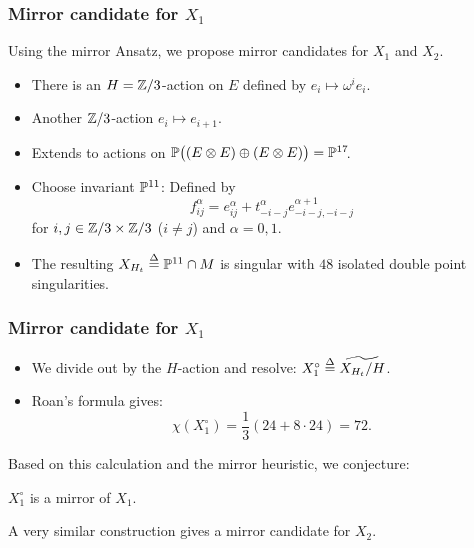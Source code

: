 \begin{frame}
\frametitle{Mirror candidate for $X_1$}

Using the mirror Ansatz, we propose mirror candidates for $X_1$ and $X_2$.

\begin{itemize}[<+->]
	\item
	There is an $H = \Z/3$-action on $E$ defined by $e_i \mapsto \omega^i e_i$.

	\item
	Another $\Z/3$-action $e_i \mapsto e_{i + 1}$.

	\item
	Extends to actions on $\P\big((E \otimes E) \oplus (E \otimes E)\big) = \P^{17}\mkern-4mu$.

	\item
	Choose invariant $\P^{11}$: Defined by
	\[
	    f_{ij}^\alpha = e_{ij}^\alpha + t_{-i-j}^\alpha e_{-i-j,-i-j}^{\alpha+1}
	\]
	for $i,j \in \Z/3 \times \Z/3$ ($i \neq j$) and $\alpha = 0,1$.

	\item
	The resulting $X_{H_t} \defeq \P^{11} \cap M$ is singular with $48$ isolated double point singularities.
\end{itemize}

\end{frame}

\begin{frame}
\frametitle{Mirror candidate for $X_1$}

\begin{itemize}
	\item We divide out by the $H$-action and resolve: $X_1^\circ \defeq \widetilde{X_{H_t}/H}$.
	\pause
	\item Roan's formula gives:
	\[
	    \chi(X_1^\circ) = \frac{1}{3} \left(24 + 8 \cdot 24\right) = 72.
	\]
\end{itemize}

Based on this calculation and the mirror heuristic, we conjecture:

\begin{conjecture}
    $X_1^\circ$ is a mirror of $X_1$.
\end{conjecture}

\pause
\begin{remark}
    A very similar construction gives a mirror candidate for $X_2$.
\end{remark}

\end{frame}